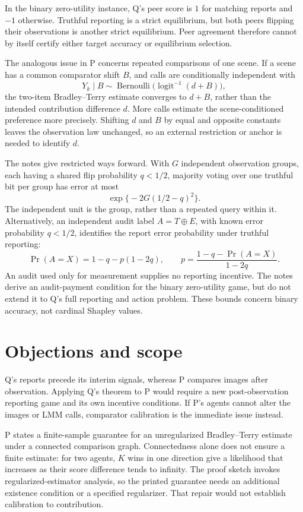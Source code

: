\documentclass{article}
\begin{document}
In the binary zero-utility instance, Q's peer score is \(1\) for matching reports and \(-1\) otherwise. Truthful reporting is a strict equilibrium, but both peers flipping their observations is another strict equilibrium. Peer agreement therefore cannot by itself certify either target accuracy or equilibrium selection. 

The analogous issue in P concerns repeated comparisons of one scene. If a scene has a common comparator shift \(B\), and calls are conditionally independent with
\[
Y_k\mid B\sim\operatorname{Bernoulli}
\bigl(\operatorname{logit}^{-1}(d+B)\bigr),
\]
the two-item Bradley--Terry estimate converges to \(d+B\), rather than the intended contribution difference \(d\). More calls estimate the scene-conditioned preference more precisely. Shifting \(d\) and \(B\) by equal and opposite constants leaves the observation law unchanged, so an external restriction or anchor is needed to identify \(d\). 

The notes give restricted ways forward. With \(G\) independent observation groups, each having a shared flip probability \(q<1/2\), majority voting over one truthful bit per group has error at most
\[
\exp\bigl\{-2G(1/2-q)^2\bigr\}.
\]
The independent unit is the group, rather than a repeated query within it. Alternatively, an independent audit label \(A=T\oplus E\), with known error probability \(q<1/2\), identifies the report error probability under truthful reporting:
\[
\Pr(A=X)=1-q-p(1-2q),
\qquad
p=\frac{1-q-\Pr(A=X)}{1-2q}.
\]
An audit used only for measurement supplies no reporting incentive. The notes derive an audit-payment condition for the binary zero-utility game, but do not extend it to Q's full reporting and action problem. These bounds concern binary accuracy, not cardinal Shapley values. 

\section{Objections and scope}

Q's reports precede its interim signals, whereas P compares images after observation. Applying Q's theorem to P would require a new post-observation reporting game and its own incentive conditions. If P's agents cannot alter the images or LMM calls, comparator calibration is the immediate issue instead. 

P states a finite-sample guarantee for an unregularized Bradley--Terry estimate under a connected comparison graph. Connectedness alone does not ensure a finite estimate: for two agents, \(K\) wins in one direction give a likelihood that increases as their score difference tends to infinity. The proof sketch invokes regularized-estimator analysis, so the printed guarantee needs an additional existence condition or a specified regularizer. That repair would not establish calibration to contribution. 
\end{document}

